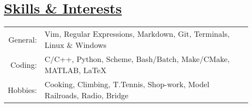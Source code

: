 \section*{\underline{Skills \& Interests}}

\begin{tabular}{ r | l }
General:    &Vim, Regular Expressions, Markdown, Git, Terminals, Linux \& Windows\\
Coding:     &C/C++, Python, Scheme, Bash/Batch, Make/CMake, MATLAB, \LaTeX\\
Hobbies:    &Cooking, Climbing, T.Tennis, Shop-work, Model Railroads, Radio, Bridge
\end{tabular}